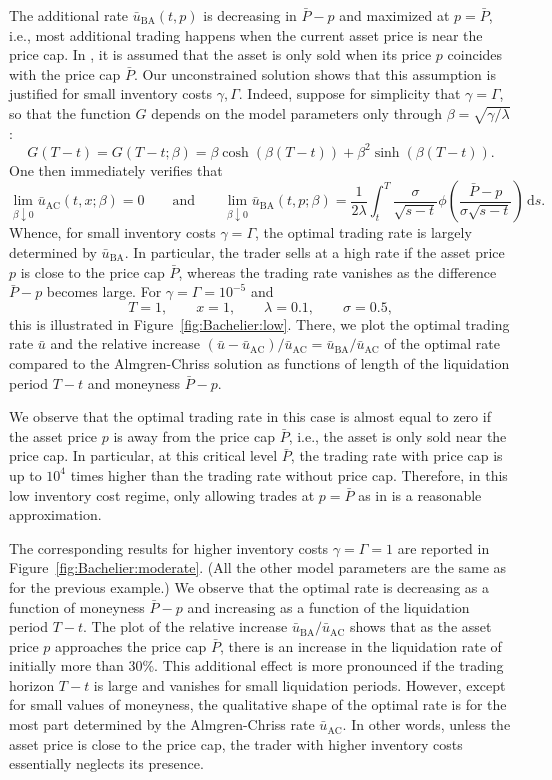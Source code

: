 \documentclass[11pt]{article}
\numberwithin{equation}{section}
\theoremstyle{definition}
\theoremstyle{remark}
\newcommand{\de}{\,\mathrm{d}}
\begin{document}
The additional rate $\bar{u}_{\mathrm{BA}}(t,p)$ is decreasing in $\bar P-p$ and maximized at $p = \bar P$, i.e., most additional trading happens when the current asset price is near the price cap. In \cite{neuman.schied.16}, it is assumed that the asset is only sold when its price $p$ coincides with the price cap $\bar P$. Our unconstrained solution shows that this assumption is justified for small inventory costs $\gamma,\Gamma$. Indeed, suppose for simplicity that $\gamma = \Gamma$, so that the function $G$ depends on the model parameters only through $\beta = \sqrt{\gamma/\lambda}$:
\[
 G(T-t) = G(T-t;\beta) = \beta\cosh(\beta(T-t)) + \beta^2 \sinh(\beta(T-t)).
\]
One then immediately verifies that
\[
 \lim_{\beta\downarrow 0} \bar u_{\mathrm{AC}}(t,x;\beta) = 0\qquad\text{and}\qquad \lim_{\beta\downarrow 0} \bar u_{\mathrm{BA}}(t,p;\beta) = \frac{1}{2\lambda} \int_t^T \frac{\sigma}{\sqrt{s-t}} \phi\left(\frac{\bar{P}-p}{\sigma\sqrt{s-t}} \right) \de s.
\]
Whence, for small inventory costs $\gamma=\Gamma$, the optimal trading rate is largely determined by $\bar{u}_{\mathrm{BA}}$. In particular, the trader sells at a high rate if the asset price $p$ is close to the price cap $\bar P$, whereas the trading rate vanishes as the difference $\bar P - p$ becomes large. For  $\gamma = \Gamma = 10^{-5}$ and 
\[
 T = 1,\qquad x = 1,\qquad \lambda = 0.1,\qquad \sigma = 0.5,
\]
this is illustrated in Figure~\ref{fig:Bachelier:low}. There, we plot the optimal trading rate $\bar u$ and the relative increase $(\bar u - \bar u_{\mathrm{AC}}) / \bar u_{\mathrm{AC}}= \bar u_{\mathrm{BA}} / \bar u_{\mathrm{AC}}$ of the optimal rate compared to the Almgren-Chriss solution as functions of length of the liquidation period $T-t$ and moneyness $\bar P - p$.

We observe that the optimal trading rate in this case is almost equal to zero if the asset price $p$ is away from the price cap $\bar P$, i.e., the asset is only sold near the price cap. In particular, at this critical level $\bar P$, the trading rate with price cap is up to $10^4$ times higher than the trading rate without price cap. Therefore, in this low inventory cost regime, only allowing trades at $p = \bar P$ as in \cite{neuman.schied.16} is a reasonable approximation.

The corresponding results for higher inventory costs $\gamma=\Gamma=1$ are reported in Figure~\ref{fig:Bachelier:moderate}. (All the other model parameters are the same as for the previous example.) We observe that the optimal rate is decreasing as a function of moneyness $\bar P-p$ and increasing as a function of the liquidation period $T-t$. The plot of the relative increase $\bar u_{\mathrm{BA}} / \bar u_{\mathrm{AC}}$ shows that as the asset price $p$ approaches the price cap $\bar P$, there is an increase in the liquidation rate of initially more than 30\%. This additional effect is more pronounced if the trading horizon $T-t$ is large and vanishes for small liquidation periods. However, except for small values of moneyness, the qualitative shape of the optimal rate is for the most part determined by the Almgren-Chriss rate $\bar u_{\mathrm{AC}}$. In other words, unless the asset price is close to the price cap, the trader with higher inventory costs essentially neglects its presence.
\end{document}
